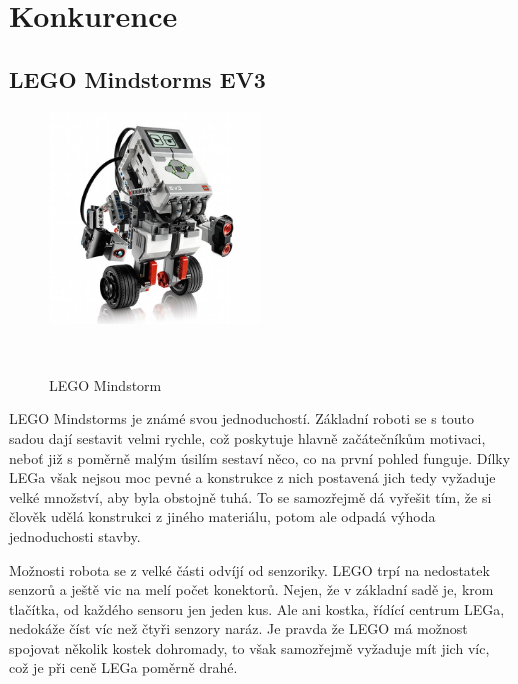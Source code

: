 \documentclass{template/socthesis}
\begin{document}

\newpage

\section{Konkurence} \label{konkurence}

\subsection{LEGO Mindstorms EV3}

\begin{figure}[h]
	
	\centering
	\includegraphics[width=0.5\textwidth]{img/EV3.jpg}
	\caption{LEGO Mindstorm}~\cite{lego_obr}
	
\end{figure}

LEGO Mindstorms \cite{lego} je známé svou jednoduchostí. Základní roboti se s touto sadou dají sestavit velmi rychle, což poskytuje hlavně začátečníkům motivaci, neboť již s poměrně malým úsilím sestaví něco, co na první pohled funguje. Dílky LEGa však nejsou moc pevné a konstrukce z nich postavená jich tedy vyžaduje velké množství, aby byla obstojně tuhá. To se samozřejmě dá vyřešit tím, že si člověk udělá konstrukci z jiného materiálu, potom ale odpadá výhoda jednoduchosti stavby.

Možnosti robota se z velké části odvíjí od senzoriky. LEGO trpí na nedostatek senzorů a ještě vic na melí počet konektorů. Nejen, že v základní sadě je, krom tlačítka, od každého sensoru jen jeden kus. Ale ani kostka, řídící centrum LEGa, nedokáže číst víc než čtyři senzory naráz. Je pravda že LEGO má možnost spojovat několik kostek dohromady, to však samozřejmě vyžaduje mít jich víc, což je při ceně LEGa poměrně drahé.
\end{document}
